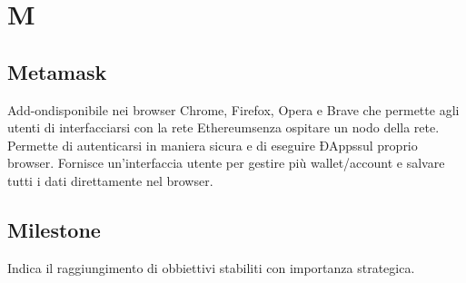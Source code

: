 \section*{M}
\subsection*{Metamask}
Add-on\glosp disponibile nei browser Chrome, Firefox, Opera e Brave che permette agli utenti di interfacciarsi con la rete Ethereum\glosp senza ospitare un nodo della rete. Permette di autenticarsi in maniera sicura e di eseguire ÐApps\glosp sul proprio browser. Fornisce un'interfaccia utente per gestire più wallet/account e salvare tutti i dati direttamente nel browser. 

\subsection*{Milestone}
Indica il raggiungimento di obbiettivi stabiliti con importanza strategica. 

